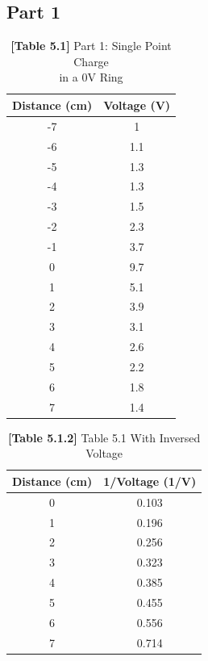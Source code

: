 \documentclass[titlepage]{article}
\begin{document}
	\subsection{Part 1}
	\begin{center}
	\hspace{1.7cm}
	\begin{paracol}{2}
		\begin{table}[h]
		\captionsetup{justification=centering}
		\centering
		\caption*{\textbf{[Table 5.1]} Part 1: Single Point Charge\\ in a 0V Ring\\}
		\begin{tabular}{c|c}
			\textbf{Distance (cm)} & \textbf{Voltage (V)}\\
			\hline
			-7 & 1\\
			-6 & 1.1\\
			-5 & 1.3\\
			-4 & 1.3\\
			-3 & 1.5\\
			-2 & 2.3\\
			-1 & 3.7\\
			0 & 9.7\\
			1 & 5.1\\
			2 & 3.9\\
			3 & 3.1\\
			4 & 2.6\\
			5 & 2.2\\
			6 & 1.8\\
			7 & 1.4\\

		\end{tabular}
		\end{table}
	\switchcolumn
	\begin{table}[h]
		\centering
	\caption*{\textbf{[Table 5.1.2]} Table 5.1 With Inversed Voltage}
		\vspace{0.35cm}
		\begin{tabular}{c|c}
			\textbf{Distance (cm)} & \textbf{1/Voltage (1/V)}\\
			\hline
			0 & 0.103\\
			1 & 0.196\\
			2 & 0.256\\
			3 & 0.323\\
			4 & 0.385\\
			5 & 0.455\\
			6 & 0.556\\
			7 & 0.714\\
		\end{tabular}
	\end{table}
\end{paracol}
\end{center}
\end{document}
